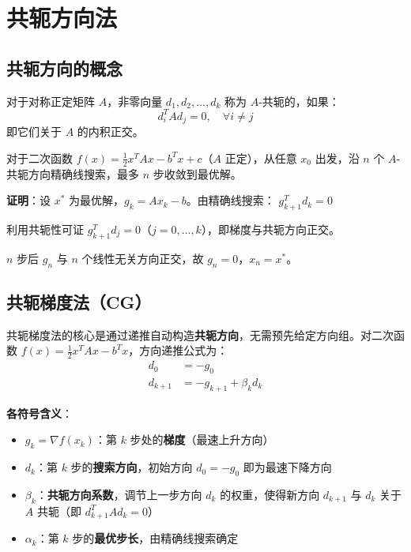 \section{共轭方向法}\label{sec:conjugate}

\subsection{共轭方向的概念}\label{sec:conjugate-def}

\begin{conceptbox}[共轭方向]
对于对称正定矩阵 $A$，非零向量 $d_1, d_2, \ldots, d_k$ 称为 $A$-共轭的，如果：
\[
d_i^T A d_j = 0, \quad \forall i \neq j
\]
即它们关于 $A$ 的内积正交。
\end{conceptbox}

\begin{theorem}[共轭方向法的有限步收敛]
对于二次函数 $f(x) = \frac{1}{2}x^T A x - b^T x + c$（$A$ 正定），从任意 $x_0$ 出发，沿 $n$ 个 $A$-共轭方向精确线搜索，最多 $n$ 步收敛到最优解。
\end{theorem}

\textbf{证明}：设 $x^*$ 为最优解，$g_k = Ax_k - b$。由精确线搜索：
$g_{k+1}^T d_k = 0$

利用共轭性可证 $g_{k+1}^T d_j = 0$（$j = 0, \ldots, k$），即梯度与共轭方向正交。

$n$ 步后 $g_n$ 与 $n$ 个线性无关方向正交，故 $g_n = 0$，$x_n = x^*$。

\subsection{共轭梯度法（CG）}\label{sec:cg}

\begin{conceptbox}[共轭梯度法]
共轭梯度法的核心是通过递推自动构造\textbf{共轭方向}，无需预先给定方向组。对二次函数 $f(x) = \frac{1}{2}x^T A x - b^T x$，方向递推公式为：
\begin{align*}
d_0 &= -g_0 \\
d_{k+1} &= -g_{k+1} + \beta_k d_k
\end{align*}

\textbf{各符号含义}：
\begin{itemize}[itemsep=0.2em]
    \item $g_k = \nabla f(x_k)$：第 $k$ 步处的\textbf{梯度}（最速上升方向）
    \item $d_k$：第 $k$ 步的\textbf{搜索方向}，初始方向 $d_0 = -g_0$ 即为最速下降方向
    \item $\beta_k$：\textbf{共轭方向系数}，调节上一步方向 $d_k$ 的权重，使得新方向 $d_{k+1}$ 与 $d_k$ 关于 $A$ 共轭（即 $d_{k+1}^T A d_k = 0$）
    \item $\alpha_k$：第 $k$ 步的\textbf{最优步长}，由精确线搜索确定
\end{itemize}
\end{conceptbox}

